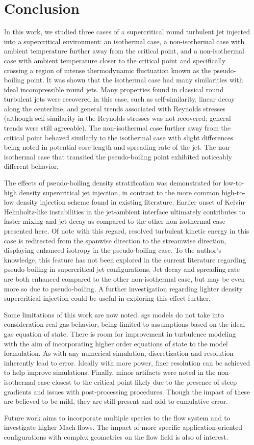 \chapter{Conclusion}

In this work, we studied three cases of a supercritical round turbulent jet injected into a supercritical environment: an isothermal case, a non-isothermal case with ambient temperature further away from the critical point, and a non-isothermal case with ambient temperature closer to the critical point and specifically crossing a region of intense thermodynamic fluctuation known as the pseudo-boiling point. It was shown that the isothermal case had many similarities with ideal incompressible round jets. Many properties found in classical round turbulent jets were recovered in this case, such as self-similarity, linear decay along the centerline, and general trends associated with Reynolds stresses (although self-similarity in the Reynolds stresses was not recovered; general trends were still agreeable). The non-isothermal case further away from the critical point behaved similarly to the isothermal case with slight differences being noted in potential core length and spreading rate of the jet. The non-isothermal case that transited the pseudo-boiling point exhibited noticeably different behavior.

The effects of pseudo-boiling density stratification was demonstrated for low-to-high density supercritical jet injection, in contrast to the more common high-to-low density injection scheme found in existing literature. Earlier onset of Kelvin-Helmholtz-like instabilities in the jet-ambient interface ultimately contributes to faster mixing and jet decay as compared to the other non-isothermal case presented here. Of note with this regard, resolved turbulent kinetic energy in this case is redirected from the spanwise direction to the streamwise direction, displaying enhanced isotropy in the pseudo-boiling case. To the author's knowledge, this feature has not been explored in the current literature regarding pseudo-boiling in supercritical jet configurations. Jet decay and spreading rate are both enhanced compared to the other non-isothermal case, but may be even more so due to pseudo-boiling. A further investigation regarding lighter density supercritical injection could be useful in exploring this effect further. 

Some limitations of this work are now noted. \gls{sgs} models do not take into consideration real gas behavior, being limited to assumptions based on the ideal gas equation of state. There is room for improvement in turbulence modeling with the aim of incorporating higher order equations of state to the model formulation. As with any numerical simulation, discretization and resolution inherently lead to error. Ideally with more power, finer resolution can be achieved to help improve simulations. Finally, minor artifacts were noted in the non-isothermal case closest to the critical point likely due to the presence of steep gradients and issues with post-processing procedures. Though the impact of these are believed to be mild, they are still present and add to cumulative error. 

Future work aims to incorporate multiple species to the flow system and to investigate higher Mach flows. The impact of more specific application-oriented configurations with complex geometries on the flow field is also of interest. 


